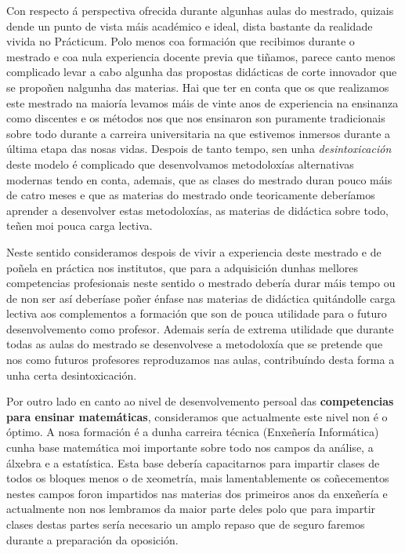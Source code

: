 Con respecto á perspectiva ofrecida durante algunhas aulas do mestrado, quizais dende un punto de vista máis académico e ideal, dista bastante da realidade vivida no Prácticum. Polo menos coa formación que recibimos durante o mestrado e coa nula experiencia docente previa que tiñamos, parece canto menos complicado levar a cabo algunha das propostas didácticas de corte innovador que se propoñen nalgunha das materias. Hai que ter en conta que os que realizamos este mestrado na maioría levamos máis de vinte anos de experiencia na ensinanza como discentes e os métodos nos que nos ensinaron son puramente tradicionais sobre todo durante a carreira universitaria na que estivemos inmersos durante a última etapa das nosas vidas. Despois de tanto tempo, sen unha \emph{desintoxicación} deste modelo é complicado que desenvolvamos metodoloxías alternativas modernas tendo en conta, ademais, que as clases do mestrado duran pouco máis de catro meses e que as materias do mestrado onde teoricamente deberíamos aprender a desenvolver estas metodoloxías, as materias de didáctica sobre todo, teñen moi pouca carga lectiva.

Neste sentido consideramos despois de vivir a experiencia deste mestrado e de poñela en práctica nos institutos, que para a adquisición dunhas mellores competencias profesionais neste sentido o mestrado debería durar máis tempo ou de non ser así deberíase poñer énfase nas materias de didáctica quitándolle carga lectiva aos complementos a formación que son de pouca utilidade para o futuro desenvolvemento como profesor. Ademais sería de extrema utilidade que durante todas as aulas do mestrado se desenvolvese a metodoloxía que se pretende que nos como futuros profesores reproduzamos nas aulas, contribuíndo desta forma a unha certa desintoxicación.


Por outro lado en canto ao nivel de desenvolvemento persoal das \textbf{competencias para ensinar matemáticas}, consideramos que actualmente este nivel non é o óptimo. A nosa formación é a dunha carreira técnica (Enxeñería Informática) cunha base matemática moi importante sobre todo nos campos da análise, a álxebra e a estatística. Esta base debería capacitarnos para impartir clases de todos os bloques menos o de xeometría, mais lamentablemente os coñecementos nestes campos foron impartidos nas materias dos primeiros anos da enxeñería e actualmente non nos lembramos da maior parte deles polo que para impartir clases destas partes sería necesario un amplo repaso que de seguro faremos durante a preparación da oposición.
